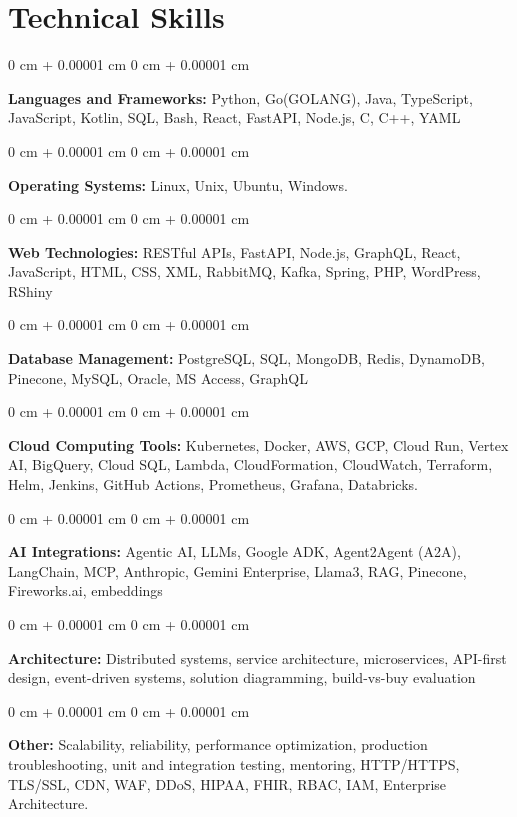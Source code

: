 \documentclass[10pt, letterpaper]{article}
\newenvironment{onecolentry}{
    \begin{adjustwidth}{
        0 cm + 0.00001 cm
    }{
        0 cm + 0.00001 cm
    }
}{
    \end{adjustwidth}
} %
\begin{document}
    \section{Technical Skills}
    \vspace{2 pt }
    \begin{onecolentry}
    \textbf{Languages and Frameworks:} Python, Go(GOLANG), Java, TypeScript, JavaScript, Kotlin, SQL, Bash, React, FastAPI, Node.js, C, C++, YAML
    \end{onecolentry}
    \begin{onecolentry}
        \textbf{Operating Systems:} Linux, Unix, Ubuntu, Windows.
    \end{onecolentry}
    \begin{onecolentry}
         \textbf{Web Technologies:} RESTful APIs, FastAPI, Node.js, GraphQL, React, JavaScript, HTML, CSS, XML, RabbitMQ, Kafka, Spring, PHP, WordPress, RShiny \end{onecolentry}
    \begin{onecolentry}
        \textbf{Database Management:} PostgreSQL, SQL, MongoDB, Redis, DynamoDB, Pinecone, MySQL, Oracle, MS Access, GraphQL \end{onecolentry}
    \begin{onecolentry}
        \textbf{Cloud Computing Tools:}
Kubernetes, Docker, AWS, GCP, Cloud Run, Vertex AI, BigQuery, Cloud SQL, Lambda, CloudFormation, CloudWatch, Terraform, Helm, Jenkins, GitHub Actions, Prometheus, Grafana, Databricks.
    \end{onecolentry}
    \begin{onecolentry}
         \textbf{AI Integrations:} Agentic AI, LLMs, Google ADK, Agent2Agent (A2A), LangChain, MCP, Anthropic, Gemini Enterprise, Llama3, RAG, Pinecone, Fireworks.ai, embeddings \end{onecolentry}
    \begin{onecolentry}
        \textbf{Architecture:} Distributed systems, service architecture, microservices, API-first design, event-driven systems, solution diagramming, build-vs-buy evaluation \end{onecolentry}
        \begin{onecolentry}
     \textbf{Other:} Scalability, reliability, performance optimization, production troubleshooting, unit and integration testing, mentoring, HTTP/HTTPS, TLS/SSL, CDN, WAF, DDoS, HIPAA, FHIR, RBAC, IAM, Enterprise Architecture.
    \end{onecolentry}

    \vspace{2 pt }
\end{document}
